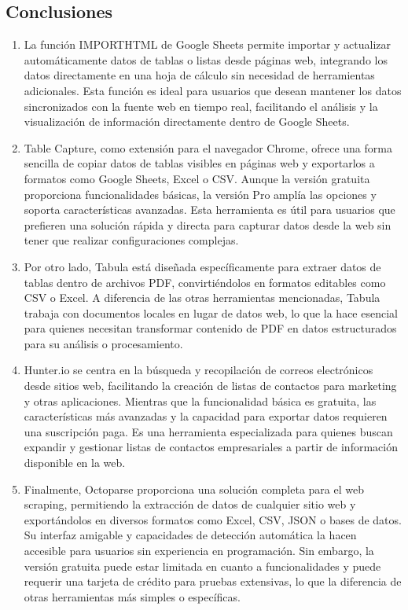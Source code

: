 \documentclass[12pt]{article}
\begin{document}
                \subsection{Conclusiones}
                        \begin{enumerate}
                                \item La función IMPORTHTML de Google Sheets permite importar y actualizar automáticamente datos de tablas o listas desde páginas web, integrando los datos directamente en una hoja de cálculo sin necesidad de herramientas adicionales. Esta función es ideal para usuarios que desean mantener los datos sincronizados con la fuente web en tiempo real, facilitando el análisis y la visualización de información directamente dentro de Google Sheets.
                                \item Table Capture, como extensión para el navegador Chrome, ofrece una forma sencilla de copiar datos de tablas visibles en páginas web y exportarlos a formatos como Google Sheets, Excel o CSV. Aunque la versión gratuita proporciona funcionalidades básicas, la versión Pro amplía las opciones y soporta características avanzadas. Esta herramienta es útil para usuarios que prefieren una solución rápida y directa para capturar datos desde la web sin tener que realizar configuraciones complejas.
                                \item Por otro lado, Tabula está diseñada específicamente para extraer datos de tablas dentro de archivos PDF, convirtiéndolos en formatos editables como CSV o Excel. A diferencia de las otras herramientas mencionadas, Tabula trabaja con documentos locales en lugar de datos web, lo que la hace esencial para quienes necesitan transformar contenido de PDF en datos estructurados para su análisis o procesamiento.
                                \item Hunter.io se centra en la búsqueda y recopilación de correos electrónicos desde sitios web, facilitando la creación de listas de contactos para marketing y otras aplicaciones. Mientras que la funcionalidad básica es gratuita, las características más avanzadas y la capacidad para exportar datos requieren una suscripción paga. Es una herramienta especializada para quienes buscan expandir y gestionar listas de contactos empresariales a partir de información disponible en la web.
                                \item Finalmente, Octoparse proporciona una solución completa para el web scraping, permitiendo la extracción de datos de cualquier sitio web y exportándolos en diversos formatos como Excel, CSV, JSON o bases de datos. Su interfaz amigable y capacidades de detección automática la hacen accesible para usuarios sin experiencia en programación. Sin embargo, la versión gratuita puede estar limitada en cuanto a funcionalidades y puede requerir una tarjeta de crédito para pruebas extensivas, lo que la diferencia de otras herramientas más simples o específicas.
                        \end{enumerate}
\end{document}

